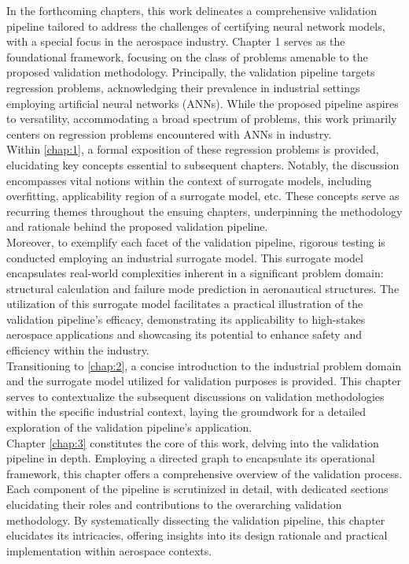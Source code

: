 \indent In the forthcoming chapters, this work delineates a comprehensive validation pipeline tailored to address the challenges of certifying neural network models, with a special focus in the aerospace industry. Chapter 1 serves as the foundational framework, focusing on the class of problems amenable to the proposed validation methodology. Principally, the validation pipeline targets regression problems, acknowledging their prevalence in industrial settings employing artificial neural networks (ANNs). While the proposed pipeline aspires to versatility, accommodating a broad spectrum of problems, this work primarily centers on regression problems encountered with ANNs in industry.\\
%
\indent Within \autoref{chap:1}, a formal exposition of these regression problems is provided, elucidating key concepts essential to subsequent chapters. Notably, the discussion encompasses vital notions within the context of surrogate models, including overfitting, applicability region of a surrogate model, etc. These concepts serve as recurring themes throughout the ensuing chapters, underpinning the methodology and rationale behind the proposed validation pipeline.\\
%
\indent Moreover, to exemplify each facet of the validation pipeline, rigorous testing is conducted employing an industrial surrogate model. This surrogate model encapsulates real-world complexities inherent in a significant problem domain: structural calculation and failure mode prediction in aeronautical structures. The utilization of this surrogate model facilitates a practical illustration of the validation pipeline's efficacy, demonstrating its applicability to high-stakes aerospace applications and showcasing its potential to enhance safety and efficiency within the industry.\\
%
\indent Transitioning to \autoref{chap:2}, a concise introduction to the industrial problem domain and the surrogate model utilized for validation purposes is provided. This chapter serves to contextualize the subsequent discussions on validation methodologies within the specific industrial context, laying the groundwork for a detailed exploration of the validation pipeline's application.\\
%
\indent Chapter \ref{chap:3} constitutes the core of this work, delving into the validation pipeline in depth. Employing a directed graph to encapsulate its operational framework, this chapter offers a comprehensive overview of the validation process. Each component of the pipeline is scrutinized in detail, with dedicated sections elucidating their roles and contributions to the overarching validation methodology. By systematically dissecting the validation pipeline, this chapter elucidates its intricacies, offering insights into its design rationale and practical implementation within aerospace contexts.\\
